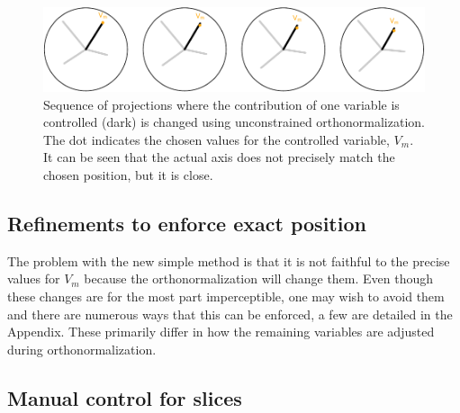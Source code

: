 \documentclass[]{interact}
\theoremstyle{plain}%
\theoremstyle{definition}
\theoremstyle{remark}
\begin{document}
\begin{figure}
\includegraphics[width=1\linewidth]{paper_files/figure-latex/manualsequence-1} \caption{Sequence of projections where the contribution of one variable is controlled (dark) is changed using unconstrained orthonormalization. The dot indicates the chosen values for the controlled variable, $V_m$. It can be seen that the actual axis does not precisely match the chosen position, but it is close.}\label{fig:manualsequence}
\end{figure}

\hypertarget{refinements-to-enforce-exact-position}{%
\subsection{Refinements to enforce exact
position}\label{refinements-to-enforce-exact-position}}

The problem with the new simple method is that it is not faithful to the
precise values for \(V_m\) because the orthonormalization will change
them. Even though these changes are for the most part imperceptible, one
may wish to avoid them and there are numerous ways that this can be
enforced, a few are detailed in the Appendix. These primarily differ in
how the remaining variables are adjusted during orthonormalization.

\hypertarget{manual-control-for-slices}{%
\subsection{Manual control for slices}\label{manual-control-for-slices}}
\end{document}
